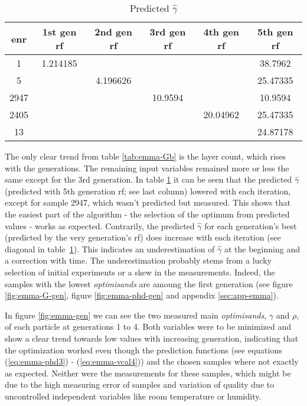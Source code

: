\begin{table}
	\centering
    \caption{Predicted $\hat{\gamma}$} 
    \label{tab:emma-pred-G}
    \begin{tabular}{cccccc}
        \hline\hline
    enr &1st gen \gls{rf}   &2nd gen \gls{rf} &3rd gen \gls{rf}    &4th gen \gls{rf}   &5th gen \gls{rf}\\
        \hline
    1       &1.214185    &       &       &       &38.7962       \\
    5       &       &4.196626       &       &       &25.47335       \\
    2947    &       &       &10.9594    &       &10.9594       \\
    2405    &       &       &       &20.04962   &25.47335       \\
    13      &       &       &       &       &24.87178   \\
        \hline\hline
    \end{tabular}
\end{table}

The only clear trend from table \ref{tab:emma-Gb} is the layer count, which rises with the generations. 
The remaining input variables remained more or less the same except for the 3rd generation. 
%
In table \ref{tab:emma-pred-G} it can be seen that the predicted $\hat{\gamma}$ 
(predicted with 5th generation \gls{rf}; see last column) lowered with each iteration, 
except for sample 2947, which wasn't predicted but measured. 
This shows that the easiest part of the algorithm - the selection of the optimum 
from predicted values - works as expected. 
%
Contrarily, the predicted $\hat{\gamma}$ for each generation's best 
(predicted by the very generation's \gls{rf}) does increase with each iteration 
(see diagonal in table~\ref{tab:emma-pred-G}). 
This indicates an underestimation of $\hat\gamma$ at the beginning and a correction with time. 
The underestimation probably stems from a lucky selection of initial experiments or a skew in the measurements. 
Indeed, the samples with the lowest \textit{optimisands} are amoung the first generation (see figure \ref{fig:emma-G-gen}, figure \ref{fig:emma-phd-gen} and appendix \ref{sec:app-emma}).

In figure \ref{fig:emma-gen} we can see the two measured main \textit{optimisands}, 
$\gamma$ and $\rho$, of each particle at generations 1 to 4. 
Both variables were to be minimized and show a clear trend towards low values with increasing generation, 
indicating that the optimization worked even though 
the prediction functions (see equations (\ref{eq:emma-phd3}) - (\ref{eq:emma-vcal4})) 
and the chosen samples where not exactly as expected. 
Neither were the measurements for these samples, which might be due to the high measuring error of samples and variation of quality due to uncontrolled independent variables like room temperature or humidity. 

